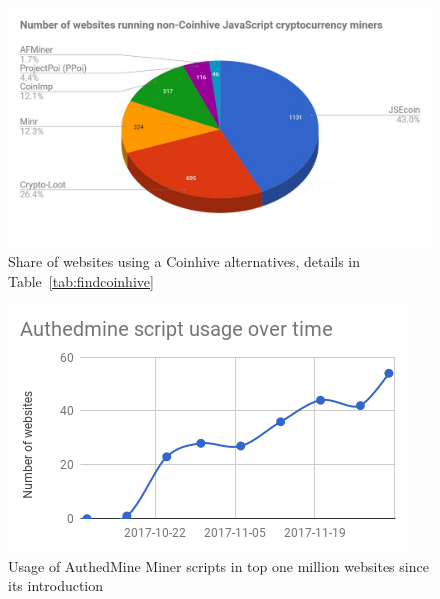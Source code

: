 \begin{figure}[t]
\centering
\includegraphics[width=0.9\linewidth]{figures/non-coinhive-miners-pie.png}
\caption{Share of websites using a Coinhive alternatives, details in Table~\ref{tab:findcoinhive} } \label{fig:copycat}
\end{figure}

\begin{figure}[t]
\centering
\includegraphics[width=0.9\linewidth]{figures/usage_of_authedmine_over_time.png}
	\caption{Usage of AuthedMine Miner scripts in top one million websites since its introduction} \label{fig:authmine}
\end{figure}

